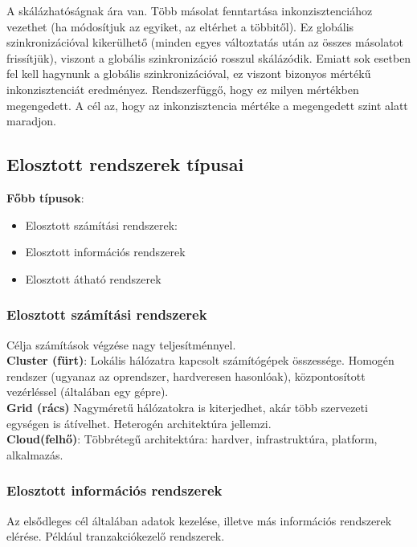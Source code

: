 \documentclass[margin=0px]{article}
\begin{document}
	A skálázhatóságnak ára van. Több másolat fenntartása inkonzisztenciához vezethet (ha módosítjuk az egyiket, az eltérhet a többitől).
	Ez globális szinkronizációval kikerülhető (minden egyes változtatás után az összes másolatot frissítjük), viszont a globális
	szinkronizáció rosszul skálázódik. Emiatt sok esetben fel kell hagynunk a globális szinkronizációval, ez viszont bizonyos
	mértékű inkonzisztenciát eredményez. Rendszerfüggő, hogy ez milyen mértékben megengedett. A cél az, hogy az inkonzisztencia mértéke
	a megengedett szint alatt maradjon.
	
	\subsection{Elosztott rendszerek típusai}
	
	\noindent \textbf{Főbb típusok}:
	\begin{itemize}
		\item	Elosztott számítási rendszerek:
		\item	Elosztott információs rendszerek
		\item 	Elosztott átható rendszerek
	\end{itemize}
	
	\subsubsection{Elosztott számítási rendszerek}
	
	Célja számítások végzése nagy teljesítménnyel.\\
	
	\noindent \textbf{Cluster (fürt)}: Lokális hálózatra kapcsolt számítógépek összessége. Homogén rendszer (ugyanaz az oprendszer,
	hardveresen hasonlóak), központosított vezérléssel (általában egy gépre).\\
	
	\noindent \textbf{Grid (rács)} Nagyméretű hálózatokra is kiterjedhet, akár több szervezeti egységen is átívelhet. Heterogén
	architektúra jellemzi.\\
	
	\noindent \textbf{Cloud(felhő)}: Többrétegű architektúra: hardver, infrastruktúra, platform, alkalmazás.
	
	\subsubsection{Elosztott információs rendszerek}
	
	Az elsődleges cél általában adatok kezelése, illetve más információs rendszerek elérése. Például tranzakciókezelő rendszerek.
	
\end{document}
